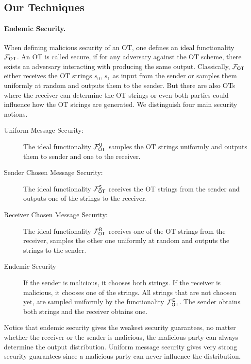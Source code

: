 \subsection{Our Techniques}

\paragraph{Endemic Security.} When defining malicious security of an OT, one defines an ideal functionality $\mathcal{F}_{\mathsf{OT}}$. An OT is called secure, if for any adversary against the OT scheme, there exists an adversary interacting with \OOT producing the same output. Classically, $\mathcal{F}_{\mathsf{OT}}$ either receives the OT strings $s_0$, $s_1$ as input from the sender or samples them uniformly at random and outputs them to the sender. But there are also OTs where the receiver can determine the OT strings or even both parties could influence how the OT strings are generated. We distinguish four main security notions.
\begin{description}
\item[Uniform Message Security:] The ideal functionality $\mathcal{F}_{\mathsf{OT}}^{\mathsf{U}}$ samples the OT strings uniformly and outputs them to sender and one to the receiver.
\item[Sender Chosen Message Security:] The ideal functionality $\mathcal{F}_{\mathsf{OT}}^{\mathsf{S}}$ receives the OT strings from the sender and outputs one of the strings to the receiver.
\item[Receiver Chosen Message Security:] The ideal functionality $\mathcal{F}_{\mathsf{OT}}^{\mathsf{R}}$ receives one of the OT strings from the receiver, samples the other one uniformly at random and outputs the strings to the sender.
\item[Endemic Security] If the sender is malicious, it chooses both strings. If the receiver is malicious, it chooses one of the strings. All strings that are not choosen yet, are sampled uniformly by the functionality $\mathcal{F}_{\mathsf{OT}}^{\mathsf{E}}$. The sender obtains both strings and the receiver obtains one. 
\end{description}

Notice that endemic security gives the weakest security guarantees, no matter whether the receiver or the sender is malicious, the malicious party can always determine the output distribution. Uniform message security gives very strong security guarantees since a malicious party can never influence the distribution.
     

